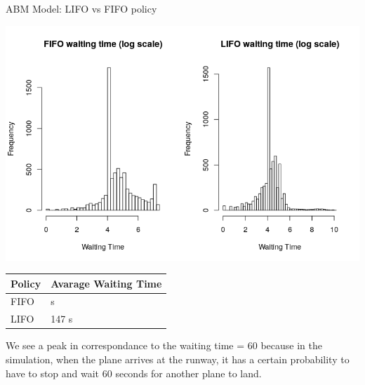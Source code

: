 \documentclass{beamer}
\begin{document}
\begin{frame}{ABM Model: LIFO vs FIFO policy}

\begin{minipage}{\textwidth}
	\begin{minipage}[b]{0.49\textwidth}
		\centering
		\includegraphics[scale=0.35]{FIFO-LIFOlog.png}
	\end{minipage}
	\hfill
	\begin{minipage}[b]{0.3\linewidth}
		\centering
		\tiny
		\begin{tabular}{p{1.1cm}p{1.1cm}}\hline
			\smallskip Policy & Avarage Waiting Time \smallskip \\ \hline
			\smallskip FIFO & \smallskip 149 s \\
			LIFO \smallskip & 147 s\\ \hline
		\end{tabular}
		
		\bigskip
		\bigskip
		\bigskip
		\bigskip
		
	\end{minipage}
\end{minipage}
We see a peak in correspondance to the waiting time = 60 because in the simulation, when the plane arrives at the runway, it has a certain probability to have to stop and wait 60 seconds for another plane to land.

\end{frame}
\end{document}
